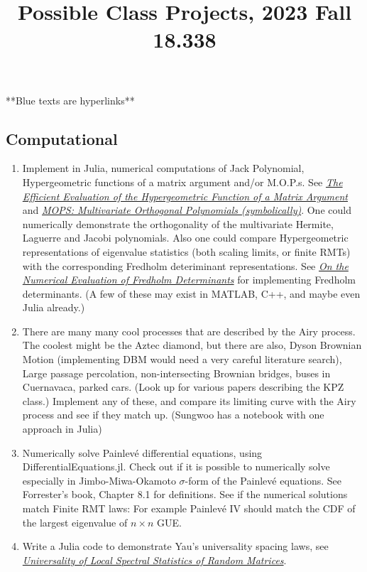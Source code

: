 \documentclass{article}
\title{Possible Class Projects, 2023 Fall 18.338}
\begin{document}
\maketitle

{\color{blue} **Blue texts are hyperlinks**}
\subsection*{Computational}
\begin{enumerate}
    \item Implement in Julia, numerical computations of Jack Polynomial, Hypergeometric functions of a matrix argument and/or M.O.P.s. See \href{https://arxiv.org/pdf/math/0505344.pdf}{\emph{\color{blue}The Efficient Evaluation of the Hypergeometric Function of a Matrix Argument}} and \href{https://arxiv.org/pdf/math-ph/0409066.pdf}{\emph{\color{blue}MOPS: Multivariate Orthogonal Polynomials (symbolically)}}. One could numerically demonstrate the orthogonality of the multivariate Hermite, Laguerre and Jacobi polynomials. Also one could compare Hypergeometric representations of eigenvalue statistics (both scaling limits, or finite RMTs) with the corresponding Fredholm deteriminant representations. See \href{https://arxiv.org/pdf/0804.2543.pdf}{\emph{\color{blue}On the Numerical Evaluation of Fredholm Determinants}} for implementing Fredholm determinants. (A few of these may exist in MATLAB, C++, and maybe even Julia already.)
    \item There are many many cool processes that are described by the Airy process. The coolest might be the Aztec diamond, but there are also, Dyson Brownian Motion (implementing DBM would need a very careful literature search), Large passage percolation, non-intersecting Brownian bridges, buses in Cuernavaca, parked cars. (Look up for various papers describing the KPZ class.) Implement any of these, and compare its limiting curve with the Airy process and see if they match up. (Sungwoo has a notebook with one approach in Julia)
    \item Numerically solve Painlev{\'e} differential equations, using DifferentialEquations.jl. Check out if it is possible to numerically solve especially in Jimbo-Miwa-Okamoto $\sigma$-form of the Painlev{\'e} equations. See Forrester's book, Chapter 8.1 for definitions. See if the numerical solutions match Finite RMT laws: For example Painlev{\'e} IV should match the CDF of the largest eigenvalue of $n\times n$ GUE. 
    \item Write a Julia code to demonstrate Yau's universality spacing laws, see \href{http://www.ams.org/journals/bull/0000-000-00/S0273-0979-2012-01372-1/S0273-0979-2012-01372-1.pdf}{\emph{\color{blue}Universality of Local Spectral Statistics of Random Matrices}}.

\end{enumerate}
\end{document}
